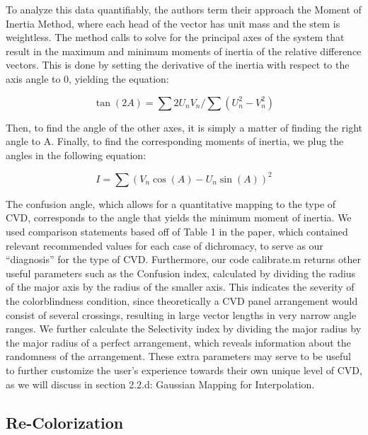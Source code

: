 \documentclass[10pt,twocolumn,letterpaper]{article}
\begin{document}
To analyze this data quantifiably, the authors term their approach the Moment of Inertia Method, where each head of the vector has unit mass and the stem is weightless. The method calls to solve for the principal axes of the system that result in the maximum and minimum moments of inertia of the relative difference vectors. This is done by setting the derivative of the inertia with respect to the axis angle to 0, yielding the equation: 

\begin{equation}\label{inertia1}
  \tan(2A) = \sum 2U_nV_n / \sum (U_n^{2} - V_n^{2})
\end{equation}

Then, to find the angle of the other axes, it is simply a matter of finding the right angle to A. 
Finally, to find the corresponding moments of inertia, we plug the angles in the following equation:

\begin{equation}\label{inertia2}
  I = \sum (V_n\cos(A) - U_n\sin(A))^{2}
\end{equation}

The confusion angle, which allows for a quantitative mapping to the type of CVD, corresponds to the angle that yields the minimum moment of inertia. We used comparison statements based off of Table 1 in the paper, which contained relevant recommended values for each case of dichromacy, to serve as our “diagnosis” for the type of CVD. Furthermore, our code calibrate.m returns other useful parameters such as the Confusion index, calculated by dividing the radius of the major axis by the radius of the smaller axis. This indicates the severity of the colorblindness condition, since theoretically a CVD panel arrangement would consist of several crossings, resulting in large vector lengths in very narrow angle ranges. We further calculate the Selectivity index by dividing the major radius by the major radius of a perfect arrangement, which reveals information about the randomness of the arrangement. These extra parameters may serve to be useful to further customize the user’s experience towards their own unique level of CVD, as we will discuss in section 2.2.d: Gaussian Mapping for Interpolation. 

\subsection{Re-Colorization}
\end{document}
